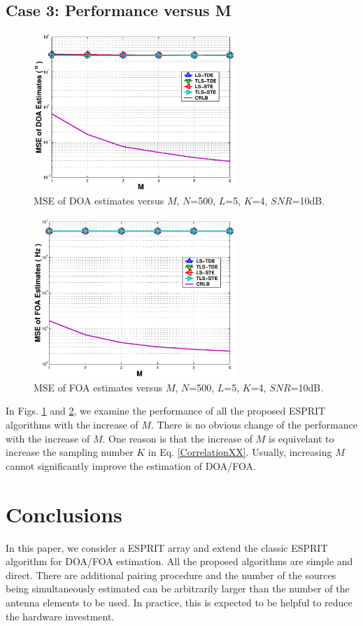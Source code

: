 \documentclass[a4paper,10pt,fleqn,twocolumn]{IEEEtran}
\begin{document}
\subsection*{Case 3: Performance versus M}
\begin{figure}
\begin{center}
\includegraphics[width=3in]{SF_DOAM.eps}
\caption{MSE of DOA estimates versus $M$, $N$=500, $L$=5, $K$=4,
$SNR$=10dB.} \label{SFDOAM}
\end{center}
\end{figure}
\begin{figure}
\begin{center}
\includegraphics[width=3in]{SF_FOAM.eps}
\caption{MSE of FOA estimates versus $M$, $N$=500, $L$=5, $K$=4,
$SNR$=10dB.} \label{SFFOAM}
\end{center}
\end{figure}

In Figs. \ref{SFDOAM} and \ref{SFFOAM}, we examine the performance
of all the proposed ESPRIT algorithms with the increase of $M$.
There is no obvious change of the performance with the increase of
$M$. One reason is that the increase of $M$ is equivelant to
increase the sampling number $K$ in Eq. \ref{CorrelationXX}.
Usually, increasing $M$ cannot significantly improve the
estimation of DOA/FOA.
\section{Conclusions}

In this paper, we consider a ESPRIT array and extend the classic
ESPRIT algorithm for DOA/FOA estimation. All the proposed
algorithms are simple and direct. There are additional pairing
procedure and the number of the sources being simultaneously
estimated can be arbitrarily larger than the number of the antenna
elements to be used. In practice, this is expected to be helpful
to reduce the hardware investment.

\tiny


\end{document}
